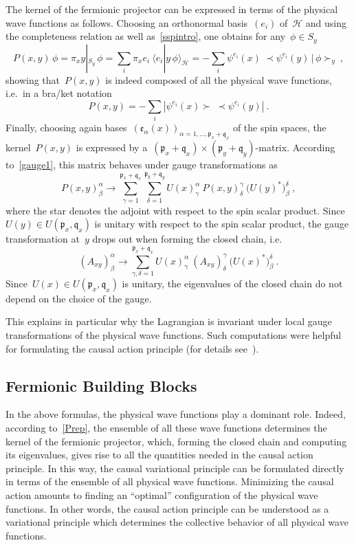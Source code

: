 \documentclass[reqno,11pt]{amsart}
\numberwithin{equation}{section}
\newcommand{\beq}{\begin{equation}}
\newcommand{\eeq}{\end{equation}}
\newcommand{\la}{\langle}
\newcommand{\ra}{\rangle}
\newcommand{\Sl}{\mathopen{\prec}}
\newcommand{\Sr}{\mathclose{\succ}}
\newcommand{\1}{\mbox{\rm 1 \hspace{-1.05 em} 1}}
\renewcommand{\H}{\mathscr{H}}
\newcommand\mpar[1]{\marginpar {\flushleft\sffamily\footnotesize #1}}
\newcommand{\p}{\mathfrak{p}}
\newcommand{\q}{\mathfrak{q}}
\begin{document}
The kernel of the fermionic projector can be expressed in terms of the physical
wave functions as follows. Choosing an orthonormal basis~$(e_i)$ of~$\H$ and using the completeness relation
as well as~\eqref{sspintro}, one obtains
for any~$\phi \in S_y$
\[ P(x,y) \, \phi= \pi_x y|_{S_y} \,\phi = \sum_i \pi_x e_i \: \la e_i | y\,\phi \ra_\H
= -\sum_i \psi^{e_i}(x) \: \Sl \psi^{e_i}(y) \,|\, \phi \Sr_y  \:, \]
showing that~$P(x,y)$ is indeed composed of all the physical wave functions, i.e.\
in a bra/ket notation
\beq \label{Prep}
P(x,y) = -\sum_i |\psi^{e_i}(x) \Sr\: \Sl \psi^{e_i}(y)|  \:.
\eeq
Finally, choosing again bases~$(\mathfrak{e}_\alpha(x))_{\alpha=1,\ldots, \p_x+\q_x}$ of the
spin spaces, the kernel~$P(x,y)$ is expressed by a~$(\p_x+\q_x) \times (\p_y + \q_y)$-matrix.
According to~\eqref{gauge1}, this matrix behaves under gauge transformations as
\[ P(x,y)^\alpha_\beta \rightarrow \sum_{\gamma=1}^{\p_x+\q_x} \sum_{\delta=1}^{\p_y+\q_y} 
U(x)^\alpha_\gamma \:P(x,y)^\gamma_\delta \: \big(U(y)^* \big)^\delta_\beta \:, \]
where the star denotes the adjoint with respect to the spin scalar product.
Since~$U(y) \in U(\p_x, \q_x)$ is unitary with respect to the spin scalar product, 
the gauge transformation at~$y$ drops out when forming the closed chain, i.e.
\[ (A_{xy})^\alpha_\beta \rightarrow \sum_{\gamma, \delta=1}^{\p_x+\q_x}
U(x)^\alpha_\gamma \:(A_{xy})^\gamma_\delta \: \big(U(x)^* \big)^\delta_\beta \:. \]
Since~$U(x) \in U(\p_x, \q_x)$ is unitary, the eigenvalues of the closed chain
do not depend on the choice of the gauge.

This explains in particular why the Lagrangian is invariant under local gauge
transformations of the physical wave functions.
Such computations were helpful for formulating the causal action principle
(for details see~\cite[Chapter~3]{pfp}).

\subsection{Fermionic Building Blocks}
In the above formulas, the physical wave functions play a dominant role.
Indeed, according to~\eqref{Prep}, the ensemble of all these wave functions
determines the kernel of the fermionic projector, which, forming the closed
chain and computing its eigenvalues, gives rise to all the quantities needed in
the causal action principle. In this way, the causal variational principle
can be formulated directly in terms of the ensemble of all physical wave functions.
Minimizing the causal action amounts to finding an ``optimal'' configuration of the physical
wave functions.
In other words, the causal action principle can be understood as a
variational principle which determines the collective behavior of all physical wave functions.
\end{document}
